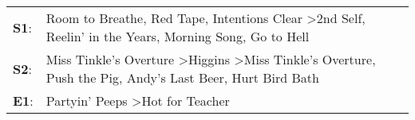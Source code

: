 \begin{supertabular}{p{0.03\textwidth}p{0.92\textwidth}}
 \textbf{S1}:  &  Room to Breathe\textsuperscript{}, \enspace Red Tape\textsuperscript{}, \enspace Intentions Clear\textsuperscript{} \textgreater \enspace 2nd Self\textsuperscript{}, \enspace Reelin' in the Years\textsuperscript{}, \enspace Morning Song\textsuperscript{}, \enspace Go to Hell\textsuperscript{}  \enspace  \\
 \textbf{S2}:  &               Miss Tinkle's Overture\textsuperscript{} \textgreater \enspace Higgins\textsuperscript{} \textgreater \enspace Miss Tinkle's Overture\textsuperscript{}, \enspace Push the Pig\textsuperscript{}, \enspace Andy's Last Beer\textsuperscript{}, \enspace Hurt Bird Bath\textsuperscript{}  \enspace  \\
 \textbf{E1}:  &                                                                                                                                                                                                               Partyin' Peeps\textsuperscript{} \textgreater \enspace Hot for Teacher\textsuperscript{}  \enspace  \\
\end{supertabular}
